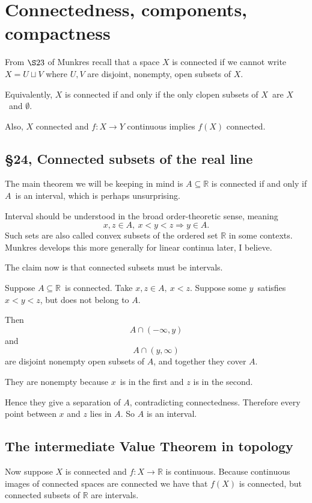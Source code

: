 \documentclass[11pt]{article}
\begin{document}
\newpage 
\section{Connectedness, components, compactness}

From $\S 23$ of Munkres recall that a space 
$X$ is connected if we cannot write 
$X = U \sqcup V$ where $U,V$ are disjoint, nonempty, 
open subsets of $X$. 

Equivalently, 
$X$ is connected if and only if the only 
clopen subsets of $X$ are $X$ and $\emptyset$. 

Also, $X$ connected and $f : X \to Y$ continuous 
implies $f(X)$ connected. 

\subsection{\S 24, Connected subsets of the real line}
The main theorem we will be keeping in mind is 
$A \subseteq \mathbb R$ is connected if and only if 
$A$ is an interval, which is perhaps unsurprising.  

Interval should be understood in the broad order-theoretic 
sense, meaning 
\[
    x,z \in A, \ x < y < z \Rightarrow y \in A. 
\]
Such sets are also called convex subsets of 
the ordered set $\mathbb R$ in some contexts. 
Munkres develops this more generally for linear continua 
later, I believe. 

The claim now is that connected subsets must be intervals.

Suppose $A \subseteq \mathbb R$ is connected. 
Take $x,z \in A, \ x < z$. 
Suppose some $y$ satisfies $x < y < z$, but does 
not belong to $A$. 

Then 
\[
    A \cap (-\infty, y)
\]
and 
\[
    A \cap (y,\infty)
\]
are disjoint nonempty open subsets of $A$, and 
together they cover $A$. 

They are nonempty because $x$ is in the 
first and $z$ is in the second. 

Hence they give a separation of $A$, contradicting 
connectedness. 
Therefore every point between $x$ and $z$ lies in $A$. 
So $A$ is an interval. 

\subsection{The intermediate Value Theorem in topology}
Now suppose $X$ is connected and 
$f : X \to \mathbb R$ is continuous. 
Because continuous images of connected spaces 
are connected we have that $f(X)$ is connected, 
but connected subsets of $\mathbb R$ are intervals. 
\end{document}
